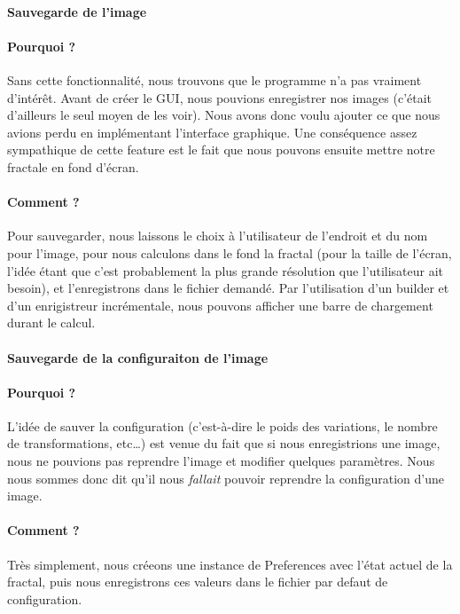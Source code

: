\documentclass[a4paper]{article}
\begin{document}
\paragraph{Sauvegarde de l'image}
\paragraph{Pourquoi ?}
Sans cette fonctionnalité, nous trouvons que le programme n'a pas vraiment d'intérêt. Avant de créer le GUI, nous pouvions enregistrer nos images (c'était d'ailleurs le seul moyen de les voir). Nous avons donc voulu ajouter ce que nous avions perdu en implémentant l'interface graphique. Une conséquence assez sympathique de cette feature est le fait que nous pouvons ensuite mettre notre fractale en fond d'écran.

\paragraph{Comment ?}
Pour sauvegarder, nous laissons le choix à l'utilisateur de l'endroit et du nom pour l'image, pour nous calculons dans le fond la fractal (pour la taille de l'écran, l'idée étant que c'est probablement la plus grande résolution que l'utilisateur ait besoin), et l'enregistrons dans le fichier demandé. Par l'utilisation d'un builder et d'un enrigistreur incrémentale, nous pouvons afficher une barre de chargement durant le calcul.

\paragraph{Sauvegarde de la configuraiton de l'image}
\paragraph{Pourquoi ?}
L'idée de sauver la configuration (c'est-à-dire le poids des variations, le nombre de transformations, etc\ldots) est venue du fait que si nous enregistrions une image, nous ne pouvions pas reprendre l'image et modifier quelques paramètres. Nous nous sommes donc dit qu'il nous \textit{fallait} pouvoir reprendre la configuration d'une image.

\paragraph{Comment ?}
Très simplement, nous créeons une instance de Preferences avec l'état actuel de la fractal, puis nous enregistrons ces valeurs dans le fichier par defaut de configuration.
\end{document}
